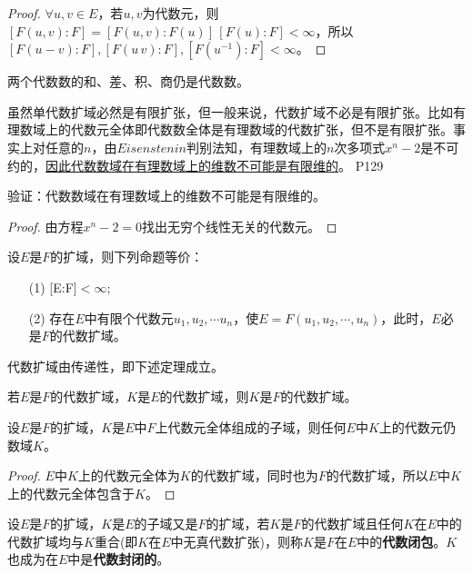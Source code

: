 \begin{proof}
	$\forall u,v\in E$，若$u,v$为代数元，则$[F(u,v):F]=[F(u,v):F(u)]\,[F(u):F]<\infty$，所以$[F(u-v):F],[F(u\,v):F],[F(u^{-1}):F]<\infty$。
\end{proof}

\begin{corollary}
	两个代数数的和、差、积、商仍是代数数。
\end{corollary}

\original
{
	虽然单代数扩域必然是有限扩张，但一般来说，代数扩域不必是有限扩张。比如有理数域上的代数元全体即代数数全体是有理数域的代数扩张，但不是有限扩张。事实上对任意的$n$，由$Eisenstenin$判别法知，有理数域上的$n$次多项式$x^{n}-2$是不可约的，\uline{因此代数数域在有理数域上的维数不可能是有限维的}。
}
{P129}

\begin{proposition}
	验证：代数数域在有理数域上的维数不可能是有限维的。
\end{proposition}

\begin{proof}
	由方程$x^{n}-2=0$找出无穷个线性无关的代数元。
\end{proof}

\begin{theorem}
	设$E$是$F$的扩域，则下列命题等价：
	\begin{enumerate}
		\item[(1)] [E:F]$<\infty$;
		\item[(2)] 存在$E$中有限个代数元$u_{1},u_{2},\cdots u_{n}$，使$E=F(u_{1},u_{2},\cdots,u_{n})$，此时，$E$必是$F$的代数扩域。
	\end{enumerate}
\end{theorem}


代数扩域由传递性，即下述定理成立。
\begin{theorem}\label{YMSthe040203}
	若$E$是$F$的代数扩域，$K$是$E$的代数扩域，则$K$是$F$的代数扩域。
\end{theorem}

\begin{corollary}
	设$E$是$F$的扩域，$K$是$E$中$F$上代数元全体组成的子域，则任何$E$中$K$上的代数元仍数域$K$。
\end{corollary}

\begin{proof}
	$E$中$K$上的代数元全体为$K$的代数扩域，同时也为$F$的代数扩域，所以$E$中$K$上的代数元全体包含于$K$。
\end{proof}

\begin{definition}\label{YMSdef040201}
	设$E$是$F$的扩域，$K$是$E$的子域又是$F$的扩域，若$K$是$F$的代数扩域且任何$K$在$E$中的代数扩域均与$K$重合(即$K$在$E$中无真代数扩张)，则称$K$是$F$在$E$中的\textbf{代数闭包}。$K$也成为在$E$中是\textbf{代数封闭的}。
\end{definition}

